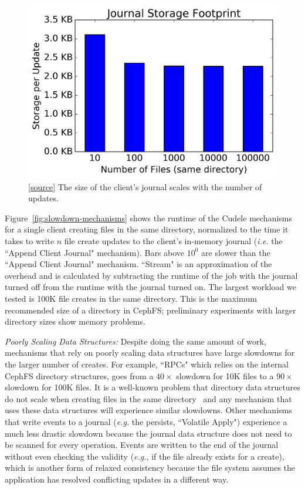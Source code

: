 \begin{figure}[tb]
\centering
\includegraphics[width=1.0\linewidth]{graphs/behavior-journal-size.png}
\caption{
[\href{https://...}{source}]
The size of the client's journal scales with the number of
updates.\label{fig:behavior-journal-size}}
\end{figure}

Figure~\ref{fig:slowdown-mechanisms} shows the runtime of the Cudele
mechanisms for a single client creating files in the same directory, normalized
to the time it takes to write \(n\) file create updates to the client's
in-memory journal ({\it i.e.} the ``Append Client Journal" mechanism). Bars
above \(10^0\) are slower than the ``Append Client Journal" mechanism.
``Stream" is an approximation of the overhead and is calculated by subtracting
the runtime of the job with the journal turned off from the runtime with the
journal turned on.  The largest workload we tested is 100K file creates in the
same directory.  This is the maximum recommended size of a directory in CephFS;
preliminary experiments with larger directory sizes show memory problems.

{\it Poorly Scaling Data Structures:} Despite doing the same amount of
work, mechanisms that rely on poorly scaling data structures have large
slowdowns for the larger number of creates. For example, ``RPCs" which relies
on the internal CephFS directory structures, goes from a \(40\times\) slowdown
for 10K files to a \(90\times\) slowdown for 100K files. It is a well-known
problem that directory data structures do not scale when creating files in the
same directory~\cite{ren:sc2014-indexfs} and any mechanism that uses these data
structures will experience similar slowdowns. Other mechanisms that write
events to a journal ({\it e.g.} the persists, ``Volatile Apply") experience a
much less drastic slowdown because the journal data structure does not need to
be scanned for every operation. Events are written to the end of the journal without
even checking the validity ({\it e.g.}, if the file already exists for a create),
which is another form of relaxed consistency because the file system assumes the
application has resolved conflicting updates in a different way.

